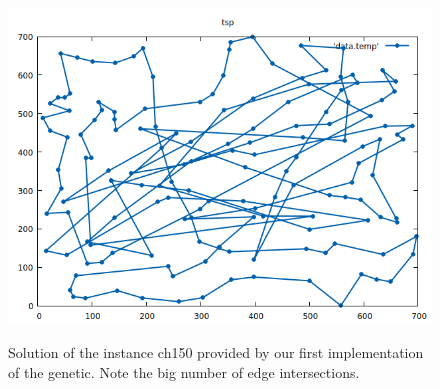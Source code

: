 \begin{figure}[h!]
\centering
	\includegraphics[scale=0.6]{media/genetic.png} \\
	\caption{Solution of the instance ch150 provided by our first implementation of the genetic. Note the big number of edge intersections.}
\end{figure}

